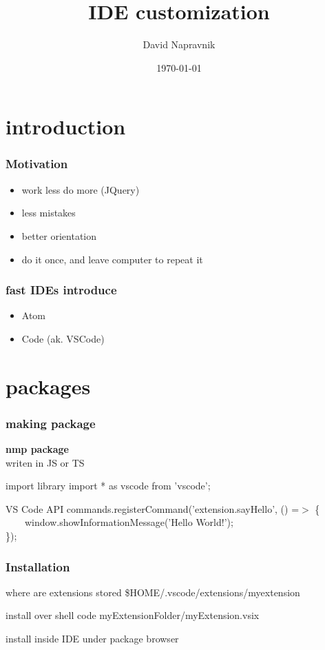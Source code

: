 \documentclass{beamer}
\title[Short title]{IDE customization} %
\author{David Napravnik} %
\institute[mff] %
{
Charles University \\ %
\medskip
\textit{ebrithil@nogare.cz} %
}
\date{\today} %
\begin{document}
\begin{frame}
\titlepage %
\end{frame}


\section{introduction}

\begin{frame}
\frametitle{Motivation}
\begin{itemize}
\item work less do more (JQuery)
\item less mistakes
\item better orientation
\item do it once, and leave computer to repeat it
\end{itemize}
\end{frame}

\begin{frame}
\frametitle{fast IDEs introduce}
\begin{itemize}
\item Atom
\item Code (ak. VSCode)
\end{itemize}
\end{frame}

\section{packages}
\begin{frame}
\frametitle{making package}
\textbf{nmp package}\\
writen in JS or TS
\begin{block}{import library}
import * as vscode from 'vscode';
\end{block}

\begin{block}{VS Code API}
commands.registerCommand('extension.sayHello', () =$>$ \{\\
~~~~window.showInformationMessage('Hello World!');\\
\});
\end{block}
\end{frame}

\begin{frame}
\frametitle{Installation}
\begin{block}{where are extensions stored}
\$HOME/.vscode/extensions/myextension
\end{block}
\begin{block}{install over shell}
code myExtensionFolder/myExtension.vsix
\end{block}
install inside IDE under package browser
\end{frame}
\end{document}
